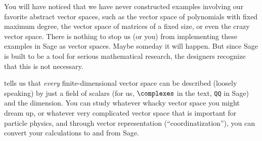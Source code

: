 You will have noticed that we have never constructed examples involving our favorite abstract vector spaces, such as the vector space of polynomials with fixed maximum degree, the vector space of matrices of a fixed size, or even the crazy vector space.  There is nothing to stop us (or you) from implementing these examples in Sage as vector spaces.  Maybe someday it will happen.  But since Sage is built to be a tool for serious mathematical research, the designers recognize that this is not necessary.\par
%
 tells us that \emph{every} finite-dimensional vector space can be described (loosely speaking) by just a field of scalars (for us, $\complexes$ in the text, \verb?QQ? in Sage) and the dimension.  You can study whatever whacky vector space you might dream up, or whatever very complicated vector space that is important for particle physics, and through vector representation (``coordinatization''), you can convert your calculations to and from Sage.
%
\begin{sageverbatim}
\end{sageverbatim}
%
